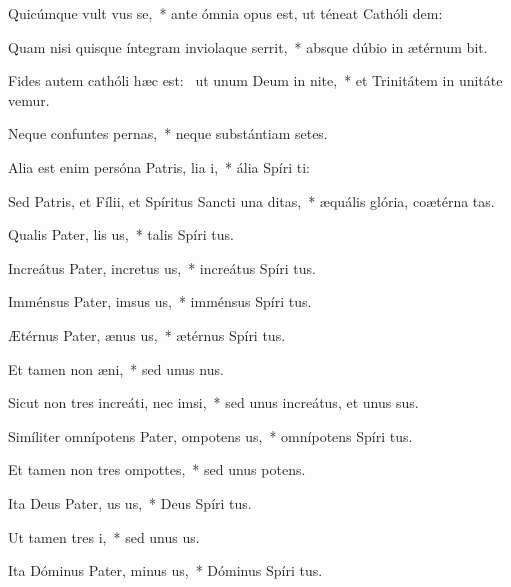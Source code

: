 \item Quicúmque vult vus se,~* ante ómnia opus est, ut téneat Cathóli dem:
\item Quam nisi quisque íntegram inviolaque serrit,~* absque dúbio in ætérnum bit.
\item Fides autem cathóli hæc est:~\pscross{} ut unum Deum in nite,~* et Trinitátem in unitáte vemur.
\item Neque confuntes pernas,~* neque substántiam setes.
\item Alia est enim persóna Patris, lia i,~* ália Spíri ti:
\item Sed Patris, et Fílii, et Spíritus Sancti una  ditas,~* æquális glória, coætérna tas.
\item Qualis Pater, lis us,~* talis Spíri tus.
\item Increátus Pater, incretus us,~* increátus Spíri tus.
\item Imménsus Pater, imsus us,~* imménsus Spíri tus.
\item Ætérnus Pater, ænus us,~* ætérnus Spíri tus.
\item Et tamen non  æni,~* sed unus nus.
\item Sicut non tres increáti, nec  imsi,~* sed unus increátus, et unus sus.
\item Simíliter omnípotens Pater, ompotens us,~* omnípotens Spíri tus.
\item Et tamen non tres ompottes,~* sed unus potens.
\item Ita Deus Pater, us us,~* Deus Spíri tus.
\item Ut tamen  tres i,~* sed unus  us.
\item Ita Dóminus Pater, minus us,~* Dóminus Spíri tus.
